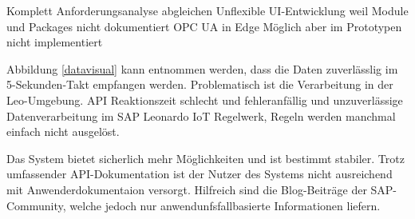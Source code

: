Komplett Anforderungsanalyse abgleichen
Unflexible UI-Entwicklung weil Module und Packages nicht dokumentiert
OPC UA in Edge Möglich aber im Prototypen nicht implementiert

Abbildung \ref{datavisual} kann entnommen werden, dass die Daten zuverlässlig im 5-Sekunden-Takt empfangen werden. Problematisch ist die Verarbeitung in der Leo-Umgebung.
API Reaktionszeit schlecht und fehleranfällig und unzuverlässige Datenverarbeitung im SAP Leonardo IoT Regelwerk,
Regeln werden manchmal einfach nicht ausgelöst.


Das System bietet sicherlich mehr Möglichkeiten und ist bestimmt stabiler. Trotz umfassender API-Dokumentation ist der Nutzer des Systems nicht ausreichend mit Anwenderdokumentaion versorgt. Hilfreich sind die Blog-Beiträge der SAP-Community, welche jedoch nur anwendunfsfallbasierte Informationen liefern.
\newpage
